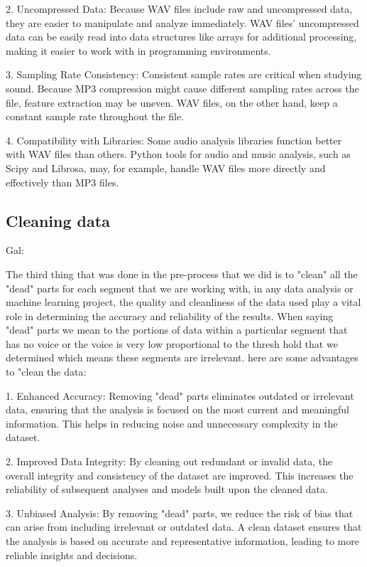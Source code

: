 \documentclass[a4paper]{article}
\begin{document}
2. Uncompressed Data: Because WAV files include raw and uncompressed data, they are easier to manipulate and analyze immediately. WAV files' uncompressed data can be easily read into data structures like arrays for additional processing, making it easier to work with in programming environments.

3. Sampling Rate Consistency: Consistent sample rates are critical when studying sound. Because MP3 compression might cause different sampling rates across the file, feature extraction may be uneven. WAV files, on the other hand, keep a constant sample rate throughout the file.

4. Compatibility with Libraries: Some audio analysis libraries function better with WAV files than others. Python tools for audio and music analysis, such as Scipy and Librosa, may, for example, handle WAV files more directly and effectively than MP3 files.

\subsection{Cleaning data}

Gal:

The third thing that was done in the pre-process that we did is to "clean" all the "dead" parts for each segment that we are working with, in any data analysis or machine learning project, the quality and cleanliness of the data used play a vital role in determining the accuracy and reliability of the results.
When saying "dead" parts we mean to the portions of data within a particular segment that has no voice or the voice is very low proportional to the thresh hold that we determined which means these segments are irrelevant.
here are some advantages to "clean the data:\newline

1. Enhanced Accuracy: Removing "dead" parts eliminates outdated or irrelevant data, ensuring that the analysis is focused on the most current and meaningful information. This helps in reducing noise and unnecessary complexity in the dataset.\newline

2. Improved Data Integrity: By cleaning out redundant or invalid data, the overall integrity and consistency of the dataset are improved. This increases the reliability of subsequent analyses and models built upon the cleaned data.\newline

3. Unbiased Analysis: By removing "dead" parts, we reduce the risk of bias that can arise from including irrelevant or outdated data. A clean dataset ensures that the analysis is based on accurate and representative information, leading to more reliable insights and decisions.
\end{document}
